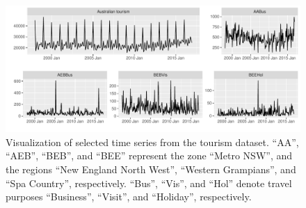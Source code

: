 \documentclass[a4paper,review,12pt,authoryear]{elsarticle}
\let\code=\texttt
\begin{document}




\begin{figure}[h!]
    \centering
    \includegraphics[width=\textwidth]{../manuscript/figures/tourism.pdf}
    \caption{Visualization of selected time series from the tourism dataset. ``AA'', ``AEB'', ``BEB'', and ``BEE'' represent the zone ``Metro NSW'', and the regions ``New England North West'', ``Western Grampians'', and ``Spa Country'', respectively. ``Bus'', ``Vis'', and ``Hol'' denote travel purposes ``Business'', ``Visit'', and ``Holiday'', respectively.}
    \label{fig:tourism}
\end{figure}






\end{document}
